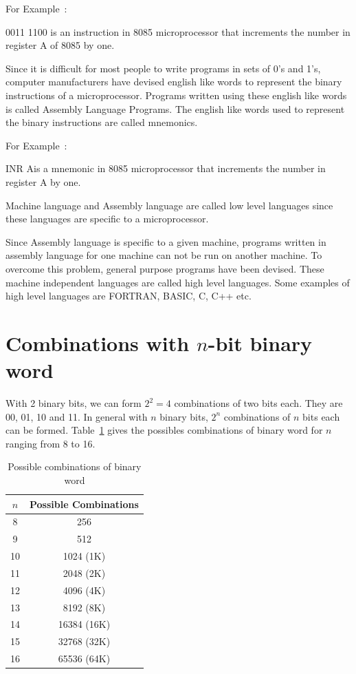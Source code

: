 For Example~:

0011 1100 is an instruction in 8085 microprocessor that increments the number in register A of 8085 by one.

\medskip
{}

Since it is difficult for most people to write programs in sets of 0's and 1's, computer manufacturers have devised english like words to represent the binary instructions of a microprocessor. Programs written using these english like words is called Assembly Language Programs. The english like words used to represent the binary instructions are called mnemonics.

For Example~:

INR A\qquad is a mnemonic in 8085 microprocessor that increments the number in register A by one.

Machine language and Assembly language are called low level languages since these languages are specific to a microprocessor.

\medskip
{}

\smallskip

Since Assembly language is specific to a given machine, programs written in assembly language for one machine can not be run on another machine. To overcome this problem, general purpose programs have been devised. These machine independent languages are called high level languages. Some examples of high level languages are FORTRAN, BASIC, C, C++ etc.

\section{Combinations with \boldmath$n$-bit binary word}\label{sec7.7}

With 2 binary bits, we can form $2^{2}=4$ combinations of two bits each. They are 00, 01, 10 and 11. In general with $n$ binary bits, $2^{n}$ combinations of $n$ bits each can be formed. Table~\ref{tab7.1} gives the possibles combinations of binary word for $n$ ranging from 8 to 16.

\smallskip
\begin{table}[h]
\centering
\caption{Possible combinations of binary word}\label{tab7.1}
\renewcommand{\arraystretch}{1.05}
\tabcolsep=10pt
\begin{tabular}{|c|c|}
\hline
{\boldmath$n$} & {\bf Possible Combinations}\\
\hline
8 & 256\\
9 & 512\\
10 & 1024 (1K)\\
11 & 2048 (2K)\\
12 & 4096 (4K)\\
13 & 8192 (8K)\\
14 & 16384 (16K)\\
15 & 32768 (32K)\\
16 & 65536 (64K)\\
\hline
\end{tabular}
\end{table}

